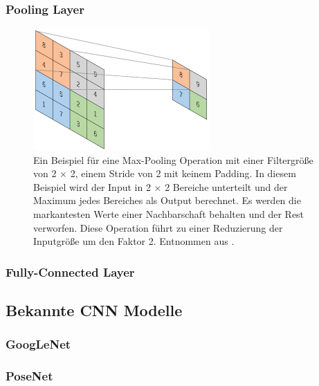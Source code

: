 \subsubsection{Pooling Layer}
\lipsum[45-55]
\begin{figure}
	\centering
	\includegraphics[width=0.6\textwidth]{images/max_pool.png}
	\caption{Ein Beispiel für eine Max-Pooling Operation mit einer Filtergröße von 2 $\times$ 2, einem Stride von 2 mit keinem Padding. In diesem Beispiel wird der Input in 2 $\times$ 2 Bereiche unterteilt und der Maximum jedes Bereiches als Output berechnet. Es werden die markantesten Werte einer Nachbarschaft behalten und der Rest verworfen. Diese Operation führt zu einer Reduzierung der Inputgröße um den Faktor 2. Entnommen aus \cite{yamashitaConvolutionalNeuralNetworks2018}.}
	\label{fig:pooling_layer}
\end{figure}
\lipsum[45-55]
\subsubsection{Fully-Connected Layer}
\subsection{Bekannte CNN Modelle}
\subsubsection{GoogLeNet}
\subsubsection{PoseNet}

\pagebreak